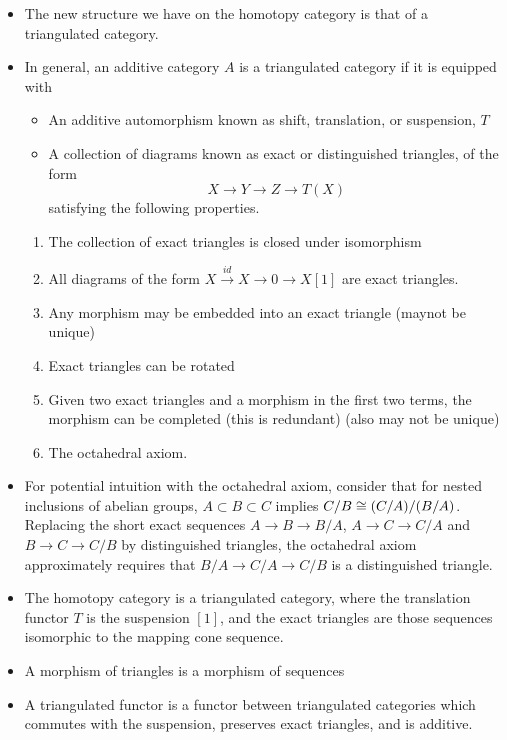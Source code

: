 \documentclass[a4paper]{article}
\begin{document}
\begin{itemize}
    \item The new structure we have on the homotopy category is that of a triangulated category.
    \item In general, an additive category $A$ is a triangulated category if it is equipped with
        \begin{itemize}
            \item An additive automorphism known as shift, translation, or suspension, $T$
            \item A collection of diagrams known as exact or distinguished triangles, of the form
                \[
                    X \to Y \to Z \to T(X)
                \]
                satisfying the following properties.
        \end{itemize}
        \begin{enumerate}
            \item The collection of exact triangles is closed under isomorphism
            \item All diagrams of the form $X \stackrel{id}{\to} X \to 0 \to X[1]$ are exact triangles.
            \item Any morphism may be embedded into an exact triangle (maynot be unique)
            \item Exact triangles can be rotated
            \item Given two exact triangles and a morphism in the first two terms, the morphism can be completed (this is redundant) (also may not be unique)
            \item The octahedral axiom.
        \end{enumerate}
    \item For potential intuition with the octahedral axiom, consider that for nested inclusions of abelian groups, $A \subset B \subset C$ implies $C/B \cong (C/A)/(B/A)$. Replacing the short exact sequences $A\to B \to B/A$, $A\to C \to C/A$ and $B \to C \to C/B$ by distinguished triangles, the octahedral axiom approximately requires that $B/A \to C/A \to C/B$ is a distinguished triangle.
    \item The homotopy category is a triangulated category, where the translation functor $T$ is the suspension $[1]$, and the exact triangles are those sequences isomorphic to the mapping cone sequence.
    \item A morphism of triangles is a morphism of sequences
    \item A triangulated functor is a functor between triangulated categories which commutes with the suspension, preserves exact triangles, and is additive.

\end{itemize}
\end{document}
